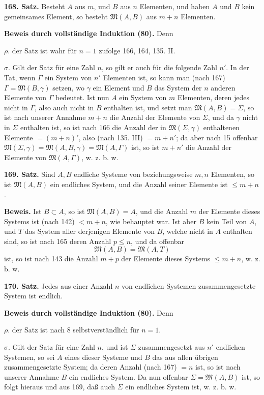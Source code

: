 \documentclass[11pt]{article}
\newcommand{\Mf}{\mathfrak{M}}
\newcommand{\partof}{\mathrel{\subset}}
\begin{document}
\noindent\textbf{168. Satz.} Besteht $A$ aus $m$, und $B$ aus $n$ Elementen, und haben $A$ und $B$ kein gemeinsames Element, so besteht $\Mf(A,B)$ aus $m+n$ Elementen.

\noindent\textbf{Beweis durch vollständige Induktion (80).} Denn

\noindent $\rho.$ der Satz ist wahr für $n=1$ zufolge 166, 164, 135. II.

\noindent $\sigma.$ Gilt der Satz für eine Zahl $n$, so gilt er auch für die folgende Zahl $n'$. In der Tat, wenn $\Gamma$ ein System von $n'$ Elementen ist, so kann man (nach 167) $\Gamma=\Mf(B,\gamma)$ setzen, wo $\gamma$ ein Element und $B$ das System der $n$ anderen Elemente von $\Gamma$ bedeutet. Ist nun $A$ ein System von $m$ Elementen, deren jedes nicht in $\Gamma$, also auch nicht in $B$ enthalten ist, und setzt man $\Mf(A,B)=\Sigma$, so ist nach unserer Annahme $m+n$ die Anzahl der Elemente von $\Sigma$, und da $\gamma$ nicht in $\Sigma$ enthalten ist, so ist nach 166 die Anzahl der in $\Mf(\Sigma,\gamma)$ enthaltenen Elemente $=(m+n)'$, also (nach 135. III) $=m+n'$; da aber nach 15 offenbar $\Mf(\Sigma,\gamma)=\Mf(A,B,\gamma)=\Mf(A,\Gamma)$ ist, so ist $m+n'$ die Anzahl der Elemente von $\Mf(A,\Gamma)$, w. z. b. w.

\noindent\textbf{169. Satz.} Sind $A,B$ endliche Systeme von beziehungsweise $m,n$ Elementen, so ist $\Mf(A,B)$ ein endliches System, und die Anzahl seiner Elemente ist $\leq m+n$.

\noindent\textbf{Beweis.} Ist $B\partof A$, so ist $\Mf(A,B)=A$, und die Anzahl $m$ der Elemente dieses Systems ist (nach 142) $<m+n$, wie behauptet war. Ist aber $B$ kein Teil von $A$, und $T$ das System aller derjenigen Elemente von $B$, welche nicht in $A$ enthalten sind, so ist nach 165 deren Anzahl $p\leq n$, und da offenbar
\[
\Mf(A,B)=\Mf(A,T)
\]
ist, so ist nach 143 die Anzahl $m+p$ der Elemente dieses Systems $\leq m+n$, w. z. b. w.

\noindent\textbf{170. Satz.} Jedes aus einer Anzahl $n$ von endlichen Systemen zusammengesetzte System ist endlich.

\noindent\textbf{Beweis durch vollständige Induktion (80).} Denn

\noindent $\rho.$ der Satz ist nach 8 selbstverständlich für $n=1$.

\noindent $\sigma.$ Gilt der Satz für eine Zahl $n$, und ist $\Sigma$ zusammengesetzt aus $n'$ endlichen Systemen, so sei $A$ eines dieser Systeme und $B$ das aus allen übrigen zusammengesetzte System; da deren Anzahl (nach 167) $=n$ ist, so ist nach unserer Annahme $B$ ein endliches System. Da nun offenbar $\Sigma=\Mf(A,B)$ ist, so folgt hieraus und aus 169, daß auch $\Sigma$ ein endliches System ist, w. z. b. w.
\end{document}

